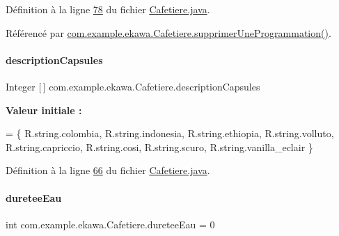 Définition à la ligne \hyperlink{_cafetiere_8java_source_l00078}{78} du fichier \hyperlink{_cafetiere_8java_source}{Cafetiere.\+java}.



Référencé par \hyperlink{_cafetiere_8java_source_l00820}{com.\+example.\+ekawa.\+Cafetiere.\+supprimer\+Une\+Programmation()}.

\mbox{\label{classcom_1_1example_1_1ekawa_1_1_cafetiere_a054b6a7668e317cfa1da3d8600311e4e}} 
\paragraph{\texorpdfstring{description\+Capsules}{descriptionCapsules}}
{\footnotesize\ttfamily Integer \mbox{[}$\,$\mbox{]} com.\+example.\+ekawa.\+Cafetiere.\+description\+Capsules\hspace{0.3cm}{\ttfamily [private]}}

{\bfseries Valeur initiale \+:}
\begin{DoxyCode}
= \{
            R.string.colombia,
            R.string.indonesia,
            R.string.ethiopia,
            R.string.volluto,
            R.string.capriccio,
            R.string.cosi,
            R.string.scuro,
            R.string.vanilla\_eclair
    \}
\end{DoxyCode}


Définition à la ligne \hyperlink{_cafetiere_8java_source_l00066}{66} du fichier \hyperlink{_cafetiere_8java_source}{Cafetiere.\+java}.

\mbox{\label{classcom_1_1example_1_1ekawa_1_1_cafetiere_aafc365a43172fca9166fb2a9006c6ecf}} 
\paragraph{\texorpdfstring{duretee\+Eau}{dureteeEau}}
{\footnotesize\ttfamily int com.\+example.\+ekawa.\+Cafetiere.\+duretee\+Eau = 0\hspace{0.3cm}{\ttfamily [private]}}




